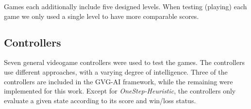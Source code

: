 \documentclass{llncs}
\begin{document}

Games each additionally include five designed levels. When testing (playing) each game we only used a single level to have more comparable scores.


\subsection{Controllers}
\label{method:controllers}

Seven general videogame controllers were used to test the games. The controllers use different approaches, with a varying degree of intelligence. Three of the controllers are included in the GVG-AI framework, while the remaining were implemented for this work. Except for \emph{OneStep-Heuristic}, the controllers only evaluate a given state according to its score and win/loss status.
\end{document}
